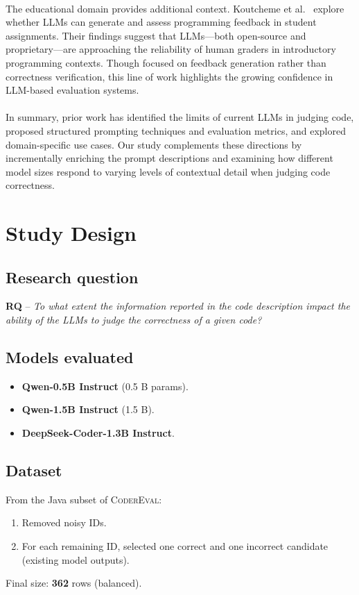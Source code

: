 \documentclass[a4paper]{usiinfbachelorproject}
\begin{document}
\\[2pt]
The educational domain provides additional context. Koutcheme et al.~\cite{koutcheme2025evaluating} explore whether LLMs can generate and assess programming feedback in student assignments. Their findings suggest that LLMs—both open-source and proprietary—are approaching the reliability of human graders in introductory programming contexts. Though focused on feedback generation rather than correctness verification, this line of work highlights the growing confidence in LLM-based evaluation systems.\\
\\[2pt]
In summary, prior work has identified the limits of current LLMs in judging code, proposed structured prompting techniques and evaluation metrics, and explored domain-specific use cases. Our study complements these directions by incrementally enriching the prompt descriptions and examining how different model sizes respond to varying levels of contextual detail when judging code correctness.


\section{Study Design}\label{sec:design}

\subsection*{Research question}
\noindent\textbf{RQ} –  
\emph{To what extent the information reported in the code description impact the ability of the LLMs to judge the correctness of a given code?}

\subsection{Models evaluated}\label{sec:models}
\begin{itemize}[leftmargin=12pt,itemsep=1pt]
  \item \textbf{Qwen-0.5B Instruct} (0.5 B params).  
  \item \textbf{Qwen-1.5B Instruct} (1.5 B).  
  \item \textbf{DeepSeek-Coder-1.3B Instruct}.  
\end{itemize}

\subsection{Dataset}\label{sec:dataset}
From the Java subset of \textsc{CoderEval}:
\begin{enumerate}[label=\alph*),leftmargin=14pt,itemsep=0pt]
  \item Removed noisy IDs.  
  \item For each remaining ID, selected one correct and one incorrect candidate (existing model outputs).  
\end{enumerate}
Final size: \textbf{362} rows (balanced).
\end{document}
